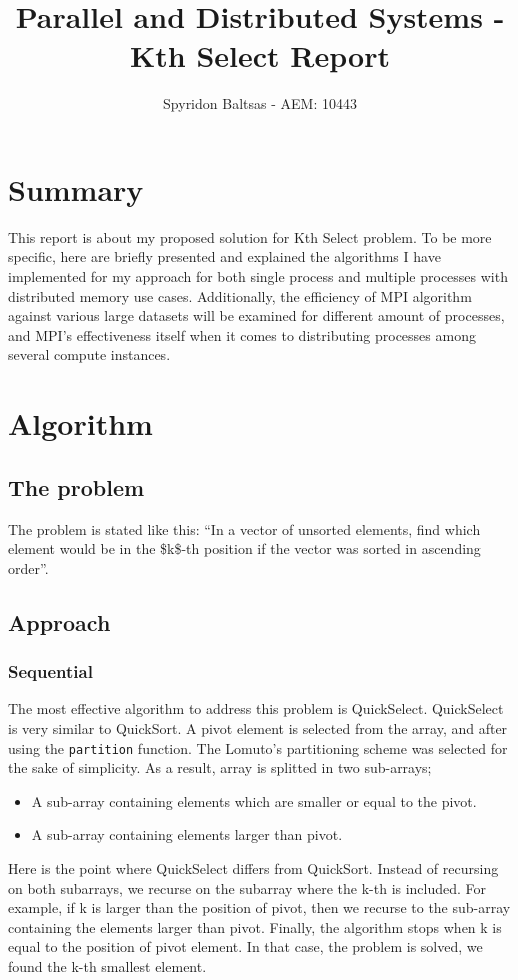 \documentclass[11pt]{article}
\author{Spyridon Baltsas - AEM: 10443}
\date{}
\title{Parallel and Distributed Systems - Kth Select Report}
\begin{document}
\maketitle

\section{Summary}
\label{sec:orgd347248}
This report is about my proposed solution for Kth Select problem. To be more specific, here are briefly presented and explained the algorithms I have implemented for my approach for both single process and multiple processes with distributed memory use cases. Additionally, the efficiency of MPI algorithm against various large datasets will be examined for different amount of processes, and MPI's effectiveness itself when it comes to distributing processes among several compute instances.
\section{Algorithm}
\label{sec:org3cef1c7}
\subsection{The problem}
\label{sec:org1c9d8f8}
The problem is stated like this: ``In a vector of unsorted elements, find which element would be in the \$k\$-th position if the vector was sorted in ascending order''.
\subsection{Approach}
\label{sec:org7ec71b5}
\subsubsection{Sequential}
\label{sec:org80cc15f}
The most effective algorithm to address this problem is QuickSelect. QuickSelect is very similar to QuickSort. A pivot element is selected from the array, and after using the \texttt{partition} function. The Lomuto's partitioning scheme was selected for the sake of simplicity. As a result, array is splitted in two sub-arrays;
\begin{itemize}
\item A sub-array containing elements which are smaller or equal to the pivot.
\item A sub-array containing elements larger than pivot.
\end{itemize}
Here is the point where QuickSelect differs from QuickSort. Instead of recursing on both subarrays, we recurse on the subarray where the k-th is included. For example, if k is larger than the position of pivot, then we recurse to the sub-array containing the elements larger than pivot. Finally, the algorithm stops when k is equal to the position of pivot element. In that case, the problem is solved, we found the k-th smallest element.
\end{document}
